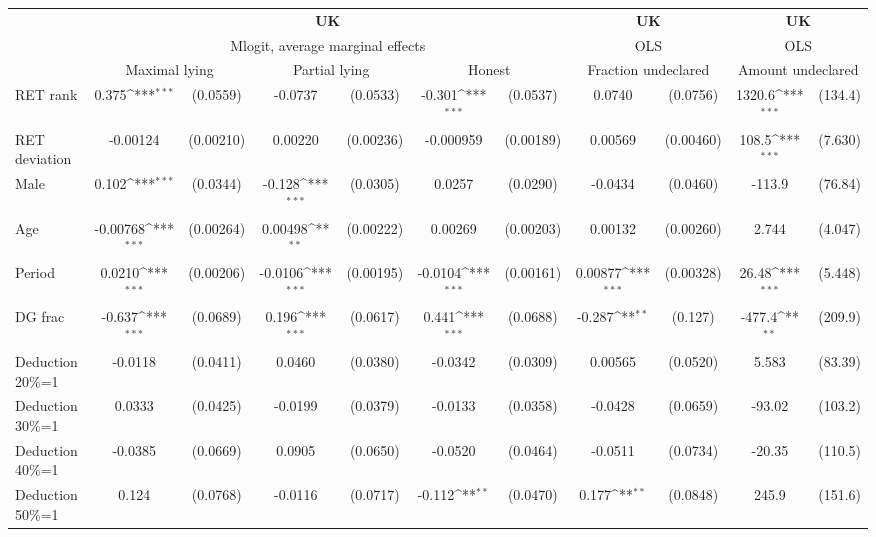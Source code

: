\def\sym#1{\ifmmode^{#1}\else\(^{#1}\)\fi}
\begin{tabular}{l|cccccc|cc|cc}
\hline\hline
&\multicolumn{6}{c|}{\bf UK}&\multicolumn{2}{c|}{\bf UK}&\multicolumn{2}{c}{\bf UK}\\ &\multicolumn{6}{c|}{Mlogit, average marginal effects }&\multicolumn{2}{c|}{OLS}&\multicolumn{2}{c}{OLS}\\
                &\multicolumn{2}{c}{Maximal lying}&\multicolumn{2}{c}{Partial lying}&\multicolumn{2}{c}{Honest}  &\multicolumn{2}{c}{Fraction undeclared}&\multicolumn{2}{c}{Amount undeclared}\\
\hline
RET rank        &    0.375\sym{***}& (0.0559)&  -0.0737         & (0.0533)&   -0.301\sym{***}& (0.0537)&   0.0740         & (0.0756)&   1320.6\sym{***}&  (134.4)\\
RET deviation   & -0.00124         &(0.00210)&  0.00220         &(0.00236)&-0.000959         &(0.00189)&  0.00569         &(0.00460)&    108.5\sym{***}&  (7.630)\\
Male            &    0.102\sym{***}& (0.0344)&   -0.128\sym{***}& (0.0305)&   0.0257         & (0.0290)&  -0.0434         & (0.0460)&   -113.9         &  (76.84)\\
Age             & -0.00768\sym{***}&(0.00264)&  0.00498\sym{**} &(0.00222)&  0.00269         &(0.00203)&  0.00132         &(0.00260)&    2.744         &  (4.047)\\
Period          &   0.0210\sym{***}&(0.00206)&  -0.0106\sym{***}&(0.00195)&  -0.0104\sym{***}&(0.00161)&  0.00877\sym{***}&(0.00328)&    26.48\sym{***}&  (5.448)\\
DG frac         &   -0.637\sym{***}& (0.0689)&    0.196\sym{***}& (0.0617)&    0.441\sym{***}& (0.0688)&   -0.287\sym{**} &  (0.127)&   -477.4\sym{**} &  (209.9)\\
Deduction 20\%=1&  -0.0118         & (0.0411)&   0.0460         & (0.0380)&  -0.0342         & (0.0309)&  0.00565         & (0.0520)&    5.583         &  (83.39)\\
Deduction 30\%=1&   0.0333         & (0.0425)&  -0.0199         & (0.0379)&  -0.0133         & (0.0358)&  -0.0428         & (0.0659)&   -93.02         &  (103.2)\\
Deduction 40\%=1&  -0.0385         & (0.0669)&   0.0905         & (0.0650)&  -0.0520         & (0.0464)&  -0.0511         & (0.0734)&   -20.35         &  (110.5)\\
Deduction 50\%=1&    0.124         & (0.0768)&  -0.0116         & (0.0717)&   -0.112\sym{**} & (0.0470)&    0.177\sym{**} & (0.0848)&    245.9         &  (151.6)\\

\end{tabular}
